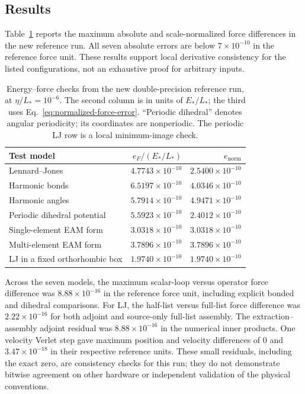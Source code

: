\documentclass[11pt,a4paper]{article}
\theoremstyle{definition}
\begin{document}
\subsection{Results}
Table~\ref{tab:numerics} reports the maximum absolute and scale-normalized force differences
in the new reference run. All seven absolute errors are below $7\times10^{-10}$ in the
reference force unit. These results support local derivative consistency for the listed
configurations, not an exhaustive proof for arbitrary inputs.
\begin{table}[tb]
\centering
\caption{Energy--force checks from the new double-precision reference run, at $\eta/L_*=10^{-6}$. The second column is in units of $E_*/L_*$; the third uses Eq.~\eqref{eq:normalized-force-error}. ``Periodic dihedral'' denotes angular periodicity; its coordinates are nonperiodic. The periodic LJ row is a local minimum-image check.}
\label{tab:numerics}
\begin{tabular}{@{}lrr@{}}
\toprule
Test model & $e_F/(E_*/L_*)$ & $e_{\mathrm{norm}}$\\
\midrule
Lennard--Jones & $4.7743\times10^{-10}$ & $2.5400\times10^{-10}$\\
Harmonic bonds & $6.5197\times10^{-10}$ & $4.0346\times10^{-10}$\\
Harmonic angles & $5.7914\times10^{-10}$ & $4.9471\times10^{-10}$\\
Periodic dihedral potential & $5.5923\times10^{-10}$ & $2.4012\times10^{-10}$\\
Single-element EAM form & $3.0318\times10^{-10}$ & $3.0318\times10^{-10}$\\
Multi-element EAM form & $3.7896\times10^{-10}$ & $3.7896\times10^{-10}$\\
LJ in a fixed orthorhombic box & $1.9740\times10^{-10}$ & $1.9740\times10^{-10}$\\
\bottomrule
\end{tabular}
\end{table}

Across the seven models, the maximum scalar-loop versus operator force difference was
$8.88\times10^{-16}$ in the reference force unit, including explicit bonded and dihedral
comparisons. For LJ, the half-list versus full-list force difference was
$2.22\times10^{-16}$ for both adjoint and source-only full-list assembly. The
extraction--assembly adjoint residual was $8.88\times10^{-16}$ in the numerical inner products.
One velocity Verlet step gave maximum position and velocity differences of $0$ and
$3.47\times10^{-18}$ in their respective reference units. These small residuals, including
the exact zero, are consistency checks for this run; they do not demonstrate bitwise agreement
on other hardware or independent validation of the physical conventions.
\end{document}

